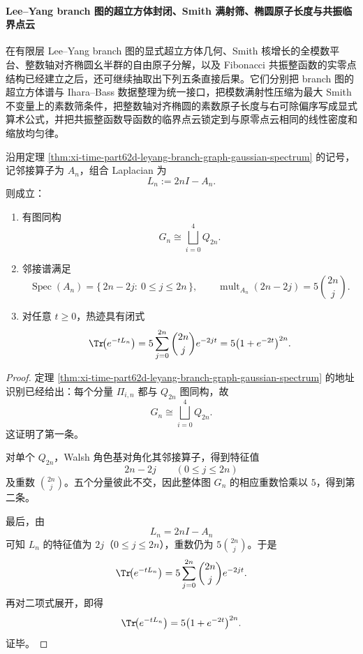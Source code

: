 \paragraph{Lee--Yang branch 图的超立方体封闭、Smith 满射筛、椭圆原子长度与共振临界点云}
在有限层 Lee--Yang branch 图的显式超立方体几何、Smith 核增长的全模数平台、整数轴对齐椭圆幺半群的自由原子分解，以及 Fibonacci 共振整函数的实零点结构已经建立之后，还可继续抽取出下列五条直接后果。它们分别把 branch 图的超立方体谱与 Ihara--Bass 数据整理为统一接口，把模数满射性压缩为最大 Smith 不变量上的素数筛条件，把整数轴对齐椭圆的素数原子长度与右可除偏序写成显式算术公式，并把共振整函数导函数的临界点云锁定到与原零点云相同的线性密度和缩放均匀律。

\begin{theorem}\label{thm:xi-time-part76-leyang-branch-hypercube-spectrum-heat}
沿用定理 \ref{thm:xi-time-part62d-leyang-branch-graph-gaussian-spectrum} 的记号，记邻接算子为 \(A_n\)，组合 Laplacian 为
\[
L_n:=2nI-A_n.
\]
则成立：
\begin{enumerate}
  \item 有图同构
  \[
  G_n\cong \bigsqcup_{i=0}^{4}Q_{2n}.
  \]
  \item 邻接谱满足
  \[
  \operatorname{Spec}(A_n)=\{\,2n-2j:\ 0\le j\le 2n\,\},
  \qquad
  \operatorname{mult}_{A_n}(2n-2j)=5\binom{2n}{j}.
  \]
  \item 对任意 \(t\ge 0\)，热迹具有闭式
  \[
  \Tr\!\bigl(e^{-tL_n}\bigr)=5\sum_{j=0}^{2n}\binom{2n}{j}e^{-2jt}
  =
  5\bigl(1+e^{-2t}\bigr)^{2n}.
  \]
\end{enumerate}
\end{theorem}
\begin{proof}
定理 \ref{thm:xi-time-part62d-leyang-branch-graph-gaussian-spectrum} 的地址识别已经给出：每个分量 \(\Pi_{i,n}\) 都与 \(Q_{2n}\) 图同构，故
\[
G_n\cong \bigsqcup_{i=0}^{4}Q_{2n}.
\]
这证明了第一条。

对单个 \(Q_{2n}\)，Walsh 角色基对角化其邻接算子，得到特征值
\[
2n-2j\qquad(0\le j\le 2n)
\]
及重数 \(\binom{2n}{j}\)。五个分量彼此不交，因此整体图 \(G_n\) 的相应重数恰乘以 \(5\)，得到第二条。

最后，由
\[
L_n=2nI-A_n
\]
可知 \(L_n\) 的特征值为 \(2j\)（\(0\le j\le 2n\)），重数仍为 \(5\binom{2n}{j}\)。于是
\[
\Tr\!\bigl(e^{-tL_n}\bigr)
=
5\sum_{j=0}^{2n}\binom{2n}{j}e^{-2jt}.
\]
再对二项式展开，即得
\[
\Tr\!\bigl(e^{-tL_n}\bigr)=5\bigl(1+e^{-2t}\bigr)^{2n}.
\]
证毕。
\end{proof}


